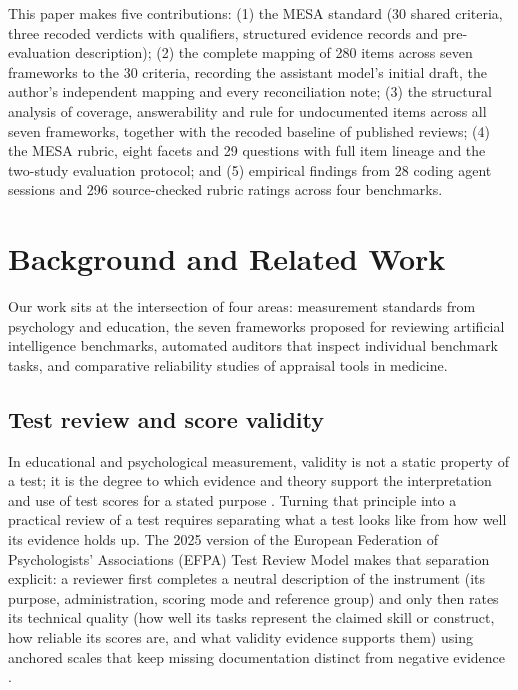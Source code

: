 \documentclass[10pt,conference]{IEEEtran}
\begin{document}
This paper makes five contributions: (1) the MESA standard (30 shared criteria, three recoded verdicts with qualifiers, structured evidence records and pre-evaluation description); (2) the complete mapping of 280 items across seven frameworks to the 30 criteria, recording the assistant model's initial draft, the author's independent mapping and every reconciliation note; (3) the structural analysis of coverage, answerability and rule for undocumented items across all seven frameworks, together with the recoded baseline of published reviews; (4) the MESA rubric, eight facets and 29 questions with full item lineage and the two-study evaluation protocol; and (5) empirical findings from 28 coding agent sessions and 296 source-checked rubric ratings across four benchmarks.

\section{Background and Related Work}
Our work sits at the intersection of four areas: measurement standards from psychology and education, the seven frameworks proposed for reviewing artificial intelligence benchmarks, automated auditors that inspect individual benchmark tasks, and comparative reliability studies of appraisal tools in medicine.

\subsection{Test review and score validity}
In educational and psychological measurement, validity is not a static property of a test; it is the degree to which evidence and theory support the interpretation and use of test scores for a stated purpose \cite{kane_validation,aera_apa_ncme_standards_2014}. Turning that principle into a practical review of a test requires separating what a test looks like from how well its evidence holds up. The 2025 version of the European Federation of Psychologists' Associations (EFPA) Test Review Model makes that separation explicit: a reviewer first completes a neutral description of the instrument (its purpose, administration, scoring mode and reference group) and only then rates its technical quality (how well its tasks represent the claimed skill or construct, how reliable its scores are, and what validity evidence supports them) using anchored scales that keep missing documentation distinct from negative evidence \cite{efpa_test_review_model_2025}.
\end{document}

